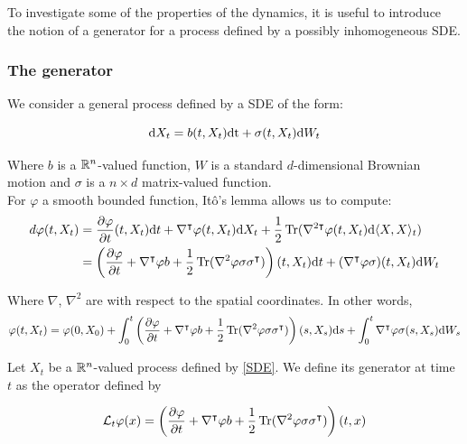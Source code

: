 To investigate some of the properties of the dynamics, it is useful to introduce the notion of a generator for a process defined by a possibly inhomogeneous SDE.
\subsubsection{The generator}
We consider a general process defined by a SDE of the form:

\begin{equation}
    \label{SDE}
    \text dX_t=b(t,X_t)\text {\text dt} + \sigma(t,X_t)\text dW_t
\end{equation}

Where $b$ is a $\mathbb{R}^n$-valued function, $W$ is a standard $d$-dimensional Brownian motion and $\sigma$ is a $n\times d$ matrix-valued function.\\
For $\varphi$ a smooth bounded function, Itô's lemma allows us to compute:
\begin{align*}
    d\varphi(t,X_t) &=\frac{\partial \varphi}{\partial t}(t,X_t)\text dt + \nabla^\intercal \varphi(t,X_t) \text dX_t + \frac12 \operatorname{Tr}(\nabla^{2\intercal}\varphi(t,X_t)\text d\langle X ,X\rangle _t)\\
    &=\left( \frac{\partial \varphi}{\partial t} + \nabla^{\intercal}\varphi b + \frac12 \operatorname{Tr}(\nabla^2\varphi \sigma\sigma^\intercal) \right)(t,X_t) \text dt+ (\nabla^\intercal \varphi\sigma )(t,X_t)\text dW_t
\end{align*}

Where $\nabla$, $\nabla^2$ are with respect to the spatial coordinates. In other words,\\


\begin{equation}
    \label{Ito}
    \varphi(t,X_t)= \varphi(0,X_0)+\int_0^t\left( \frac{\partial \varphi}{\partial t} + \nabla^\intercal\varphi b + \frac12 \operatorname{Tr}(\nabla^2\varphi\sigma\sigma^\intercal) \right)(s,X_s) \text ds + \int_0^t\nabla^\intercal \varphi\sigma(s,X_s)\text dW_s
\end{equation}

    \begin{definition}
        Let $X_t$ be a $\mathbb{R}^n$-valued process defined by \ref{SDE}. We define its generator at time $t$ as the operator defined by

        \begin{equation}
            \label{Generator}
            \mathcal{L}_t \varphi(x)=\left(\frac{\partial \varphi}{\partial t} + \nabla^\intercal\varphi b + \frac12 \operatorname{Tr}(\nabla^2\varphi \sigma\sigma^\intercal)\right)(t,x)
        \end{equation}

    \end{definition}

